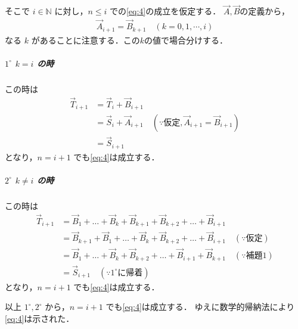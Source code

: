 \documentclass[../../main.tex]{subfiles}
\begin{document}
そこで $i \in \mathbb{N}$ に対し，$n \le i$ での\cref{eq:4}の成立を仮定する．
$\vec{A},\vec{B}$の定義から，
\begin{align}
  \vec{A}_{i+1} = \vec{B}_{k+1} \quad (k=0,1,\cdots,i)
\end{align}
なる $k$ があることに注意する．この$k$の値で場合分けする．

\subparagraph{$1^\circ$ $k=i$ の時}

この時は
\begin{align}
  \vec{T}_{i+1}
  &= \vec{T}_i + \vec{B}_{i+1} \\
  &= \vec{S}_i + \vec{A}_{i+1} \quad (\because \text{仮定}, \vec{A}_{i+1} = \vec{B}_{i+1}) \\
  &= \vec{S}_{i+1}
\end{align}
となり，$n=i+1$ でも\cref{eq:4}は成立する．

\subparagraph{$2^\circ$ $k \ne i$ の時}

この時は
\begin{align}
  \vec{T}_{i+1}
  &= \vec{B}_1 + \dots + \vec{B}_k + \vec{B}_{k+1} + \vec{B}_{k+2} + \dots + \vec{B}_{i+1} \\
  &= \vec{B}_{k+1} + \vec{B}_1 + \dots + \vec{B}_k + \vec{B}_{k+2} + \dots + \vec{B}_{i+1} \quad (\because \text{仮定}) \\
  &= \vec{B}_1 + \dots + \vec{B}_k + \vec{B}_{k+2} + \dots + \vec{B}_{i+1} + \vec{B}_{k+1} \quad (\because \text{補題1}) \\
  &= \vec{S}_{i+1} \quad (\because 1^\circ \text{に帰着})
\end{align}
となり，$n=i+1$ でも\cref{eq:4}は成立する．
\casesend

以上 $1^\circ, 2^\circ$ から，$n=i+1$ でも\cref{eq:4}は成立する．
ゆえに数学的帰納法により\cref{eq:4}は示された．

\newpage
\end{document}

